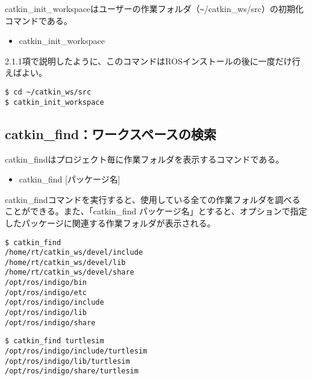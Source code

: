 catkin\_init\_workspaceはユーザーの作業フォルダ（\verb|~|/catkin\_ws/src）の初期化コマンドである。

\vspace{\baselineskip}
\begin{itemize}
\item catkin\_init\_workspace
\end{itemize}
\vspace{\baselineskip}

2.1.1項で説明したように、このコマンドはROSインストールの後に一度だけ行えばよい。

\begin{lstlisting}[language=ROS]
$ cd ~/catkin_ws/src
$ catkin_init_workspace
\end{lstlisting}

\subsection{catkin\_find：ワークスペースの検索}

catkin\_findはプロジェクト毎に作業フォルダを表示するコマンドである。

\vspace{\baselineskip}
\begin{itemize}
\item  catkin\_find [パッケージ名]
\end{itemize}
\vspace{\baselineskip}

catkin\_findコマンドを実行すると、使用している全ての作業フォルダを調べることができる。また、「catkin\_find パッケージ名」とすると、オプションで指定したパッケージに関連する作業フォルダが表示される。

\begin{lstlisting}[language=ROS]
$ catkin_find
/home/rt/catkin_ws/devel/include
/home/rt/catkin_ws/devel/lib
/home/rt/catkin_ws/devel/share
/opt/ros/indigo/bin
/opt/ros/indigo/etc
/opt/ros/indigo/include
/opt/ros/indigo/lib
/opt/ros/indigo/share
\end{lstlisting}

\begin{lstlisting}[language=ROS]
$ catkin_find turtlesim
/opt/ros/indigo/include/turtlesim
/opt/ros/indigo/lib/turtlesim
/opt/ros/indigo/share/turtlesim
\end{lstlisting}

